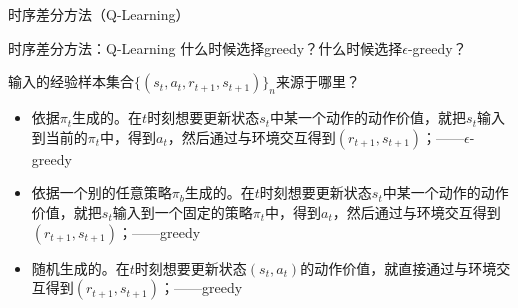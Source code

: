 \begin{section}{时序差分方法\alert{（Q-Learning）}}
\begin{frame}{时序差分方法：Q-Learning}
    什么时候选择greedy？什么时候选择$\epsilon$-greedy？
    
    输入的经验样本集合$\{(s_t, a_t, r_{t+1}, s_{t+1})\}_n$来源于哪里？
    \begin{itemize}
        \item 依据$\pi_t$生成的。在$t$时刻想要更新状态$s_t$中某一个动作的动作价值，就把$s_t$输入到当前的$\pi_t$中，得到$a_t$，然后通过与环境交互得到$(r_{t+1},s_{t+1})$；\alert{——{$\epsilon$}-greedy}
        \item 依据一个别的任意策略$\pi_b$生成的。在$t$时刻想要更新状态$s_t$中某一个动作的动作价值，就把$s_t$输入到一个固定的策略$\pi_t$中，得到$a_t$，然后通过与环境交互得到$(r_{t+1},s_{t+1})$；\alert{——greedy}
        \item 随机生成的。在$t$时刻想要更新状态$(s_t,a_t)$的动作价值，就直接通过与环境交互得到$(r_{t+1},s_{t+1})$；\alert{——greedy}
    \end{itemize}
\end{frame}

\end{section}